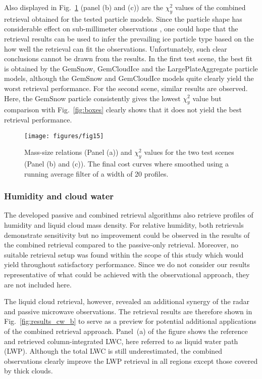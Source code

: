 \documentclass[journal abbreviation, manuscript]{copernicus}
\begin{document}
Also displayed in Fig.~\ref{fig:costs} (panel (b) and (c)) are the $\chi^2_y$
values of the combined retrieval obtained for the tested particle models. Since
the particle shape has considerable effect on sub-millimeter observations
\citep{ekelund19}, one could hope that the retrieval results can be used to
infer the prevailing ice particle type based on the how well the retrieval can
fit the observations. Unfortunately, such clear conclusions cannot be drawn from
the results. In the first test scene, the best fit is obtained by the GemSnow,
GemCloudIce and the LargePlateAggregate particle models, although the GemSnow
and GemCloudIce models quite clearly yield the worst retrieval performance. For
the second scene, similar results are observed. Here, the GemSnow particle
consistently gives the lowest $\chi^2_y$ value but comparison with
Fig.~\ref{fig:boxes} clearly shows that it does not yield the best retrieval
performance.

\begin{figure}[!h]
\centering
\texttt{[image: figures/fig15]}
\caption{Mass-size relations (Panel (a)) and $\chi^2_y$ values for the two test
  scenes (Panel (b) and (c)). The final cost curves where smoothed using a
  running average filter of a width of 20 profiles.}
\label{fig:costs}
\end{figure}


\subsubsection{Humidity and cloud water}

The developed passive and combined retrieval algorithms also retrieve profiles
of humidity and liquid cloud mass density. For relative humidity, both
retrievals demonstrate sensitivity but no improvement could be observed in the
results of the combined retrieval compared to the passive-only retrieval.
Moreover, no suitable retrieval setup was found within the scope of this study
which would yield throughout satisfactory performance. Since we do not consider
our results representative of what could be achieved with the observational
approach, they are not included here.

The liquid cloud retrieval, however, revealed an additional synergy of the radar
and passive microwave observations. The retrieval results are therefore shown in
Fig.~\ref{fig:results_cw_b} to serve as a preview for potential additional
applications of the combined retrieval approach. Panel~(a) of the figure shows
the reference and retrieved column-integrated LWC, here referred to as liquid
water path (LWP). Although the total LWC is still underestimated, the combined
observations clearly improve the LWP retrieval in all regions except those covered
by thick clouds.
\end{document}
